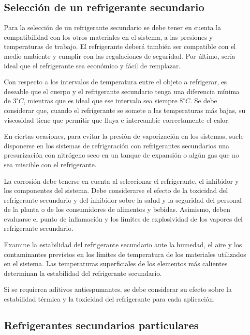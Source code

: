 	\subsection{Selección de un refrigerante secundario}

	Para la selección de un refrigerante secundario se debe tener en cuenta la compatibilidad con los otros materiales en el sistema, a las presiones y temperaturas de trabajo. El refrigerante deberá también ser compatible con el medio ambiente y cumplir con las regulaciones de seguridad. Por último, sería ideal que el refrigerante sea económico y fácil de remplazar. 

	Con respecto a los intervalos de temperatura entre el objeto a refrigerar, es deseable que el cuerpo y el refrigerante secundario tenga una diferencia mínima de $3^\circ C$, mientras que es ideal que ese intervalo sea siempre $8^\circ C$. Se debe considerar que, cuando el refrigerante se somete a las temperaturas más bajas, su viscosidad tiene que permitir que fluya e intercambie correctamente el calor.
	
	En ciertas ocasiones, para evitar la presión de vaporización en los sistemas, suele disponerse en los sistemas de refrigeración con refrigerantes secundarios una presurización con nitrógeno seco en un tanque de expansión o algún gas que no sea miscible con el refrigerante.

	La corrosión debe tenerse en cuenta al seleccionar el refrigerante, el inhibidor y los componentes del sistema. Debe considerarse el efecto de la toxicidad del refrigerante secundario y del inhibidor sobre la salud y la seguridad del personal de la planta o de los consumidores de alimentos y bebidas. Asimismo, deben evaluarse el punto de inflamación y los límites de explosividad de los vapores del refrigerante secundario.

	Examine la estabilidad del refrigerante secundario ante la humedad, el aire y los contaminantes previstos en los límites de temperatura de los materiales utilizados en el sistema. Las temperaturas superficiales de los elementos más calientes determinan la estabilidad del refrigerante secundario.
	
	Si se requieren aditivos antiespumantes, se debe considerar su efecto sobre la estabilidad térmica y la toxicidad del refrigerante para cada aplicación.

	\subsection{Refrigerantes secundarios particulares}

